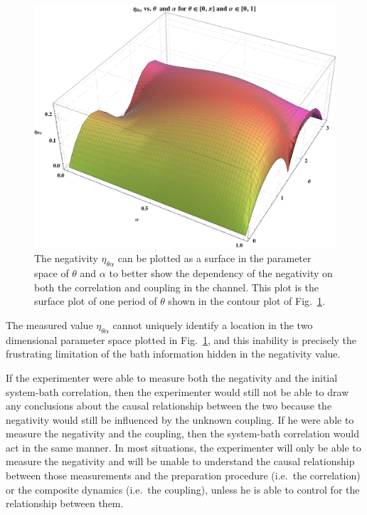\begin{figure}[t!h]
\centering
\includegraphics[scale=0.32]{eatthetaalphaIII.png}
\caption{The negativity $\eta_{\theta\alpha}$ can be plotted as a surface in the parameter space of $\theta$ and $\alpha$ to better show the dependency of the negativity on both the correlation and coupling in the channel.  This plot is the surface plot of one period of $\theta$ shown in the contour plot of Fig.\ \ref{fig:etathetaalpha}.}
\label{fig:etathetaalpha}
\end{figure}

The measured value $\eta_{\theta\alpha}$ cannot uniquely identify a location in the two dimensional parameter space plotted in Fig.\ \ref{fig:etathetaalpha}, and this inability is precisely the frustrating limitation of the bath information hidden in the negativity value.  

If the experimenter were able to measure both the negativity and the initial system-bath correlation, then the experimenter would still not be able to draw any conclusions about the causal relationship between the two because the negativity would still be influenced by the unknown coupling.  If he were able to measure the negativity and the coupling, then the system-bath correlation would act in the same manner.  In most situations, the experimenter will only be able to measure the negativity and will be unable to understand the causal relationship between those measurements and the preparation procedure (i.e.\ the correlation) or the composite dynamics (i.e.\ the coupling), unless he is able to control for the relationship between them.   

